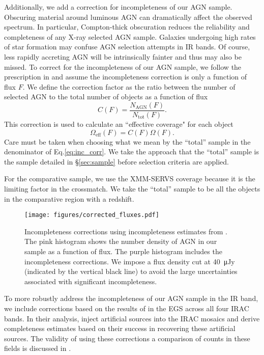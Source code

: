 \documentclass[twocolumn, trackchanges]{aastex63}
\begin{document}
Additionally, we add a correction for incompleteness of our AGN sample.
Obscuring material around luminous AGN can dramatically affect the observed spectrum.
In particular, Compton-thick obscuration reduces the reliability and completeness of any X-ray selected AGN sample. 
Galaxies undergoing high rates of star formation may confuse AGN selection attempts in IR bands.
Of course, less rapidly accreting AGN will be intrinsically fainter and thus may also be missed.
To correct for the incompleteness of our AGN sample, we follow the prescription in \cite{ranalli_210_2016} and assume the incompleteness correction is only a function of flux $F$. 
We define the correction factor as the ratio between the number of selected AGN to the total number of objects as a function of flux
\begin{equation}
\label{eq:inc_corr}
C(F) = \frac{N_\mathrm{AGN}(F)}{N_\mathrm{tot}(F)}.
\end{equation}
This correction is used to calculate an ``effective coverage" for each object
\begin{equation}
\Omega_\mathrm{eff} (F) = C(F)\Omega(F).
\end{equation}
Care must be taken when choosing what we mean by the ``total'' sample in the denominator of Eq.\ref{eq:inc_corr}.
We take the approach that the ``total'' sample is the sample detailed in \S\ref{sec:sample} before selection criteria are applied.

For the comparative sample, we use the XMM-SERVS coverage because it is the limiting factor in the crossmatch.
We take the ``total'' sample to be all the objects in the comparative region with a redshift.

\begin{figure}[hptb]
\centering
\texttt{[image: figures/corrected\_fluxes.pdf]}
\caption{Incompleteness corrections using incompleteness estimates from \cite{barmby_catalog_2008}.
The pink histogram shows the number density of AGN in our sample as a function of flux.
The purple histogram includes the incompleteness corrections. We impose a flux density cut at \SI{40}{\micro Jy} (indicated by the vertical black line) to avoid the large uncertainties associated with significant incompleteness.}
\label{fig:corr_flux}
\end{figure}

To more robustly address the incompleteness of our AGN sample in the IR band, we include corrections based on the results of \cite{barmby_catalog_2008} in the EGS across all four IRAC bands.
In their analysis, \cite{barmby_catalog_2008} inject artificial sources into the IRAC mosaics and derive completeness estimates based on their success in recovering these artificial sources.
The validity of using these corrections a comparison of counts in these fields is discussed in \cite{lacy_spitzer_2021}.
\end{document}
